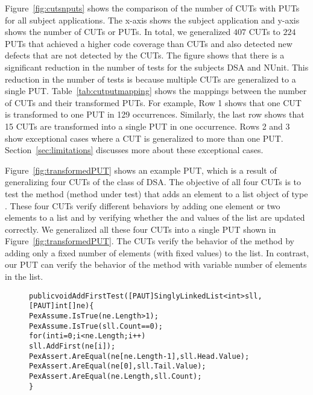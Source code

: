 Figure~\ref{fig:cutsnputs} shows the comparison of the number of CUTs with PUTs for all subject applications. The x-axis shows the subject application and y-axis shows the number of CUTs or PUTs. In total, we generalized $407$ CUTs to $224$ PUTs that achieved a higher code coverage than CUTs and also detected new defects that are not detected by the CUTs. The figure shows that there is a significant reduction in the number of tests for the subjects DSA and NUnit. This reduction in the number of tests is because multiple CUTs are generalized to a single PUT. Table~\ref{tab:cutputmapping} shows the mappings between the number of CUTs and their transformed PUTs. For example, Row 1 shows that one CUT is transformed to one PUT in 129 occurrences. Similarly, the last row shows that 15 CUTs are transformed into a single PUT in one occurrence. Rows 2 and 3 show exceptional cases where a CUT is generalized to more than one PUT. Section~\ref{sec:limitations} discusses more about these exceptional cases. 

Figure~\ref{fig:transformedPUT} shows an example PUT, which is a result of generalizing four CUTs of the  class of DSA. The objective of all four CUTs is to test the  method (method under test) that adds an element to a list object of type . These four CUTs verify different behaviors by adding one element or two elements to a list and by verifying whether the  and  values of the list are updated correctly. We generalized all these four CUTs into a single PUT shown in Figure~\ref{fig:transformedPUT}. The CUTs verify the behavior of the  method by adding only a fixed number of elements (with fixed values) to the list. In contrast, our PUT can verify the behavior of the  method with variable number of elements in the list. 

\begin{figure}[t]
\begin{CodeOut}
\begin{alltt}
public void AddFirstTest([PAUT]SinglyLinkedList<int> sll, 
\hspace*{0.6in}[PAUT]int[] ne) \{            
\hspace*{0.2in}PexAssume.IsTrue(ne.Length > 1);
\hspace*{0.2in}PexAssume.IsTrue(sll.Count == 0);
\hspace*{0.2in}for (int i = 0; i < ne.Length; i++)
\hspace*{0.4in}sll.AddFirst(ne[i]);
\hspace*{0.2in}PexAssert.AreEqual(ne[ne.Length - 1], sll.Head.Value);            
\hspace*{0.2in}PexAssert.AreEqual(ne[0], sll.Tail.Value);
\hspace*{0.2in}PexAssert.AreEqual(ne.Length, sll.Count);
\}
\end{alltt}
\end{CodeOut}\vspace*{-4ex}
 \vspace*{-3ex}
\end{figure}

